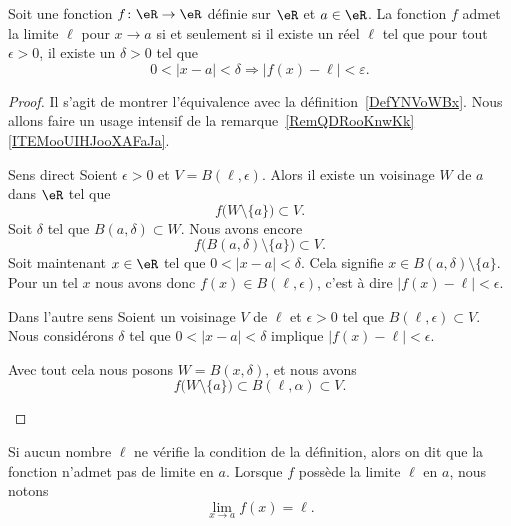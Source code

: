 \begin{proposition}       \label{PropAJQQooQQClfp}
	Soit une fonction $f\colon \eR\to \eR$ définie sur \( \eR\) et $a\in \eR$. La fonction \( f\) admet la limite \( \ell\) pour \( x\to a\) si et seulement si il existe un réel $\ell$ tel que pour tout \( \epsilon>0\), il existe un \( \delta>0\) tel que
	\begin{equation}\label{EqDefLimiteFonction}
		0<| x-a |<\delta\Rightarrow| f(x)-\ell |<\varepsilon.
	\end{equation}
\end{proposition}

\begin{proof}
    Il s'agit de montrer l'équivalence avec la définition~\ref{DefYNVoWBx}. Nous allons faire un usage intensif de la remarque~\ref{RemQDRooKnwKk}\ref{ITEMooUIHJooXAFaJa}.
    \begin{subproof}
    \item[Sens direct]
        Soient \( \epsilon>0\) et \( V=B(\ell,\epsilon)\). Alors il existe un voisinage \( W\) de \( a\) dans \( \eR\) tel que
        \begin{equation}
            f\big( W\setminus\{ a \} \big)\subset V.
        \end{equation}
        Soit \( \delta\) tel que \( B(a,\delta)\subset W\). Nous avons encore
        \begin{equation}
            f\big( B(a,\delta)\setminus\{ a \} \big)\subset V.
        \end{equation}
        Soit maintenant \( x\in \eR\) tel que $0<| x-a |<\delta$. Cela signifie \( x\in B(a,\delta)\setminus\{ a \}\). Pour un tel \( x\) nous avons donc \( f(x)\in B(\ell,\epsilon)\), c'est à dire \( | f(x)-\ell |<\epsilon\).
    \item[Dans l'autre sens]
        Soient un voisinage \( V\) de \( \ell\) et \( \epsilon>0\) tel que \( B(\ell,\epsilon)\subset V\). Nous considérons \( \delta\) tel que \( 0<| x-a |<\delta\) implique \( | f(x)-\ell |<\epsilon\).

        Avec tout cela nous posons \( W=B(x,\delta)\), et nous avons
        \begin{equation}
            f\big( W\setminus\{ a \} \big)\subset B(\ell,\alpha)\subset V.
        \end{equation}
    \end{subproof}
\end{proof}

Si aucun nombre $\ell$ ne vérifie la condition de la définition, alors on dit que la fonction n'admet pas de limite en $a$. Lorsque $f$ possède la limite $\ell$ en $a$, nous notons
\begin{equation}
	\lim_{x\to a} f(x)=\ell.
\end{equation}

